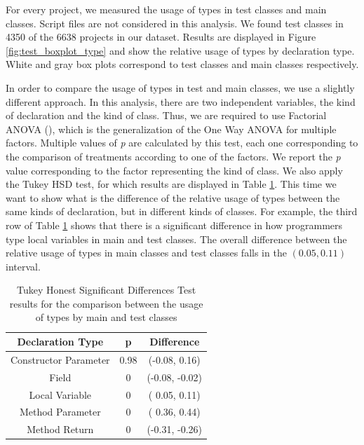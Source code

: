 \documentclass[msc]{ppgccufmg}
\begin{document}
For every project, we measured the usage of types in test classes and main classes.
Script files are not considered in this analysis.
We found test classes in 4350 of the 6638 projects in our dataset.
Results are displayed in Figure \ref{fig:test_boxplot_type} and show the relative usage of types by declaration type.
White and gray box plots correspond to test classes and main classes respectively.

In order to compare the usage of types in test and main classes, we use a slightly different approach.
In this analysis, there are two independent variables, the kind of declaration and the kind of class.
Thus, we are required to use Factorial ANOVA (\cite{Wohlin2012}), which is the generalization of the One Way ANOVA for multiple factors.
Multiple values of \emph{p} are calculated by this test, each one corresponding to the comparison of treatments according to one of the factors.
We report the \emph{p} value corresponding to the factor representing the kind of class.
We also apply the Tukey HSD test, for which results are displayed in Table \ref{tab:test_utest_type}.
This time we want to show what is the difference of the relative usage of types between the same kinds of declaration, but in different kinds of classes.
For example, the third row of Table \ref{tab:test_utest_type} shows that there is a significant difference in how programmers type local variables in main and test classes.
The overall difference between the relative usage of types in main classes and test classes falls in the $(0.05, 0.11)$ interval.


\begin{table}[h!]
\centering{}%

\caption{Tukey Honest Significant Differences Test results for the comparison between the usage of types by main and test classes}
\begin{tabular}{|c|c|c|}
\hline 
Declaration Type    & p & Difference \\
\hline 
\hline 
Constructor Parameter &  0.98     & (-0.08,  0.16) \\ \hline
Field &  0          & (-0.08, -0.02)  \\ \hline
Local Variable &  0          & ( 0.05,  0.11) \\ \hline
Method Parameter &  0          & ( 0.36,  0.44) \\ \hline
Method Return &  0          & (-0.31, -0.26) \\ \hline
\end{tabular}
\label{tab:test_utest_type}
\end{table}
\end{document}
